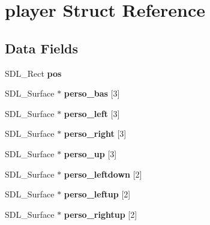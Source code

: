 \hypertarget{structplayer}{}\section{player Struct Reference}
\label{structplayer}
\subsection*{Data Fields}
\begin{DoxyCompactItemize}
\item 
S\+D\+L\+\_\+\+Rect {\bfseries pos}\hypertarget{structplayer_a3ad723e25fd68342601e128927372c8f}{}\label{structplayer_a3ad723e25fd68342601e128927372c8f}

\item 
S\+D\+L\+\_\+\+Surface $\ast$ {\bfseries perso\+\_\+bas} \mbox{[}3\mbox{]}\hypertarget{structplayer_a232f0044153d9d251c7d531e0aeec19e}{}\label{structplayer_a232f0044153d9d251c7d531e0aeec19e}

\item 
S\+D\+L\+\_\+\+Surface $\ast$ {\bfseries perso\+\_\+left} \mbox{[}3\mbox{]}\hypertarget{structplayer_ae54e04cfde45b1ccf5bb180075599fa9}{}\label{structplayer_ae54e04cfde45b1ccf5bb180075599fa9}

\item 
S\+D\+L\+\_\+\+Surface $\ast$ {\bfseries perso\+\_\+right} \mbox{[}3\mbox{]}\hypertarget{structplayer_a945801e0c47745f4c50751903d196cd7}{}\label{structplayer_a945801e0c47745f4c50751903d196cd7}

\item 
S\+D\+L\+\_\+\+Surface $\ast$ {\bfseries perso\+\_\+up} \mbox{[}3\mbox{]}\hypertarget{structplayer_ab555552842487fc35edf931ca0dc6b7b}{}\label{structplayer_ab555552842487fc35edf931ca0dc6b7b}

\item 
S\+D\+L\+\_\+\+Surface $\ast$ {\bfseries perso\+\_\+leftdown} \mbox{[}2\mbox{]}\hypertarget{structplayer_a224ae74e7a4cb2d09c49b1ccd4fa2518}{}\label{structplayer_a224ae74e7a4cb2d09c49b1ccd4fa2518}

\item 
S\+D\+L\+\_\+\+Surface $\ast$ {\bfseries perso\+\_\+leftup} \mbox{[}2\mbox{]}\hypertarget{structplayer_abf38dd8d230c09d4d74a8a29adf6ed47}{}\label{structplayer_abf38dd8d230c09d4d74a8a29adf6ed47}

\item 
S\+D\+L\+\_\+\+Surface $\ast$ {\bfseries perso\+\_\+rightup} \mbox{[}2\mbox{]}\hypertarget{structplayer_a5f8873a7155271fc56d40af84f753ea4}{}\label{structplayer_a5f8873a7155271fc56d40af84f753ea4}


\end{DoxyCompactItemize}
